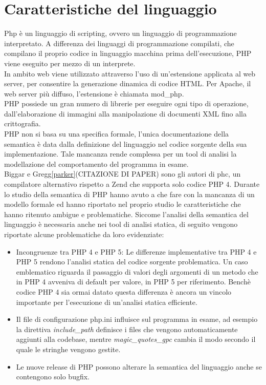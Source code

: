 \section{Caratteristiche del linguaggio}
Php è un linguaggio di scripting, ovvero un linguaggio di programmazione interpretato. A differenza dei linguaggi di programmazione compilati, che compilano il proprio codice in linguaggio macchina prima dell'esecuzione, PHP viene eseguito per mezzo di un interprete.\\
In ambito web viene utilizzato attraverso l'uso di un'estensione applicata al web server, per consentire la generazione dinamica di codice HTML. Per Apache, il web server più diffuso, l'estensione è chiamata mod\_php.\\
PHP possiede un gran numero di librerie per eseguire ogni tipo di operazione, dall'elaborazione di immagini alla manipolazione di documenti XML fino alla crittografia.\\
PHP non si basa su una specifica formale, l'unica documentazione della semantica è data dalla definizione del linguaggio nel codice sorgente della sua implementazione. Tale mancanza rende complessa per un tool di analisi la modellazione del comportamento del programma in esame.\\
Biggar e Gregg\ref{parker}(CITAZIONE DI 
 PAPER) sono gli autori di phc, un compilatore alternativo rispetto a Zend che supporta solo codice PHP 4. Durante lo studio della semantica di PHP hanno avuto a che fare con la mancanza di un modello formale ed hanno riportato nel proprio studio le caratteristiche che hanno ritenuto ambigue e problematiche. Siccome l'analisi della semantica del linguaggio è necessaria anche nei tool di analisi statica, di seguito vengono riportate alcune problematiche da loro evidenziate:
\begin{itemize}
\item Incongruenze tra PHP 4 e PHP 5: Le differenze implementative tra PHP 4 e PHP 5 rendono l'analisi statica del codice sorgente problematica. Un caso emblematico riguarda il passaggio di valori degli argomenti di un metodo che in PHP 4 avveniva di default per valore, in PHP 5 per riferimento. Benchè codice PHP 4 sia ormai datato questa differenza è ancora un vincolo importante per l'esecuzione di un'analisi statica efficiente.
\item Il file di configurazione php.ini influisce sul programma in esame, ad esempio la direttiva \emph{include\_path} definisce i files che vengono automaticamente aggiunti alla codebase, mentre \emph{magic\_quotes\_gpc} cambia il modo secondo il quale le stringhe vengono gestite.
\item Le nuove release di PHP possono alterare la semantica del linguaggio anche se contengono solo bugfix.
\end{itemize}

